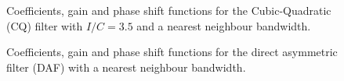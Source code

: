 \documentclass[
]{article}
\newcommand\1{\mathds{1}}
\begin{document}
\begin{figure}

\caption{\label{fig-graphs-coef-cq-nn}Coefficients, gain and phase shift
functions for the Cubic-Quadratic (CQ) filter with \(I/C=3.5\) and a
nearest neighbour bandwidth.}


\end{figure}%

\begin{figure}

\caption{\label{fig-graphs-coef-daf-nn}Coefficients, gain and phase
shift functions for the direct asymmetric filter (DAF) with a nearest
neighbour bandwidth.}


\end{figure}%
\end{document}
